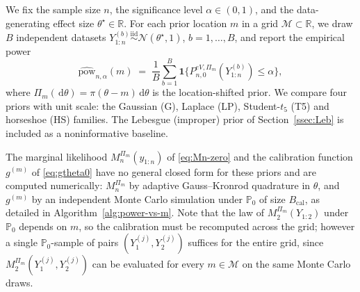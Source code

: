 \documentclass{article}%
\newcommand{\R}{\mathbb{R}}
\newcommand{\Prob}{\mathbb{P}}
\newcommand{\dd}{\,\mathrm{d}}
\begin{document}
We fix the sample size \(n\), the significance level
\(\alpha\in(0,1)\), and the data-generating effect size
\(\theta^\star\in\R\). For each prior location \(m\) in a grid
\(\mathcal M\subset\R\), we draw \(B\) independent datasets
\(Y_{1:n}^{(b)}\stackrel{\mathrm{iid}}{\sim}\mathcal
N(\theta^\star,1)\), \(b=1,\ldots,B\), and report the empirical power
\begin{equation}\label{eq:power-def}
   \widehat{\mathrm{pow}}_{n,\alpha}(m)
   \;=\;\frac{1}{B}\sum_{b=1}^B
       \mathbf 1\!\bigl\{P_{n,0}^{eV,\Pi_m}(Y_{1:n}^{(b)})\leq\alpha\bigr\},
\end{equation}
where \(\Pi_m(\dd\theta)=\pi(\theta-m)\dd\theta\) is the
location-shifted prior. We compare four priors with unit scale:
the Gaussian (G), Laplace (LP), Student-\(t_5\) (T5) and horseshoe
(HS) families. %
The Lebesgue (improper) prior of
Section~\ref{ssec:Leb} is included as a noninformative baseline.

The marginal likelihood \(M_n^{\Pi_m}(y_{1:n})\) of \eqref{eq:Mn-zero} and the calibration function \(g^{(m)}\) of \eqref{eq:gtheta0} have no general closed form for these priors and are computed numerically: \(M_n^{\Pi_m}\) by adaptive
Gauss--Kronrod quadrature in \(\theta\), and \(g^{(m)}\) by an independent Monte Carlo simulation under \(\Prob_0\) of size
\(B_{\mathrm{cal}}\), as detailed in Algorithm~\ref{alg:power-vs-m}. Note that the law of \(M_2^{\Pi_m}(Y_{1:2})\) under \(\Prob_0\) depends on \(m\), so the calibration must be recomputed across the grid; however a single \(\Prob_0\)-sample of pairs \((Y_1^{(j)},Y_2^{(j)})\) suffices for the entire grid, since \(M_2^{\Pi_m}(Y_1^{(j)},Y_2^{(j)})\) can be evaluated for every \(m\in\mathcal M\) on the same Monte Carlo draws.
\end{document}

